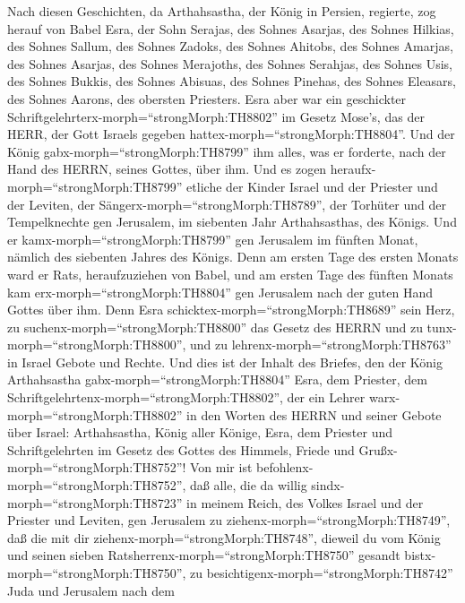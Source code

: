  Nach diesen Geschichten, da Arthahsastha, der König in
Persien, regierte, zog herauf von Babel Esra, der Sohn Serajas, des
Sohnes Asarjas, des Sohnes Hilkias,  des Sohnes Sallum, des
Sohnes Zadoks, des Sohnes Ahitobs,  des Sohnes Amarjas, des
Sohnes Asarjas, des Sohnes Merajoths,  des Sohnes Serahjas,
des Sohnes Usis, des Sohnes Bukkis,  des Sohnes Abisuas, des
Sohnes Pinehas, des Sohnes Eleasars, des Sohnes Aarons, des obersten
Priesters.  Esra aber war ein geschickter
Schriftgelehrterx-morph=``strongMorph:TH8802'' im Gesetz Mose's, das der
HERR, der Gott Israels gegeben hattex-morph=``strongMorph:TH8804''. Und
der König gabx-morph=``strongMorph:TH8799'' ihm alles, was er forderte,
nach der Hand des HERRN, seines Gottes, über ihm.  Und es
zogen heraufx-morph=``strongMorph:TH8799'' etliche der Kinder Israel und
der Priester und der Leviten, der Sängerx-morph=``strongMorph:TH8789'',
der Torhüter und der Tempelknechte gen Jerusalem, im siebenten Jahr
Arthahsasthas, des Königs.  Und er
kamx-morph=``strongMorph:TH8799'' gen Jerusalem im fünften Monat,
nämlich des siebenten Jahres des Königs.  Denn am ersten
Tage des ersten Monats ward er Rats, heraufzuziehen von Babel, und am
ersten Tage des fünften Monats kam erx-morph=``strongMorph:TH8804'' gen
Jerusalem nach der guten Hand Gottes über ihm.  Denn Esra
schicktex-morph=``strongMorph:TH8689'' sein Herz, zu
suchenx-morph=``strongMorph:TH8800'' das Gesetz des HERRN und zu
tunx-morph=``strongMorph:TH8800'', und zu
lehrenx-morph=``strongMorph:TH8763'' in Israel Gebote und Rechte.
 Und dies ist der Inhalt des Briefes, den der König
Arthahsastha gabx-morph=``strongMorph:TH8804'' Esra, dem Priester, dem
Schriftgelehrtenx-morph=``strongMorph:TH8802'', der ein Lehrer
warx-morph=``strongMorph:TH8802'' in den Worten des HERRN und seiner
Gebote über Israel:  Arthahsastha, König aller Könige,
Esra, dem Priester und Schriftgelehrten im Gesetz des Gottes des
Himmels, Friede und Grußx-morph=``strongMorph:TH8752''! 
Von mir ist befohlenx-morph=``strongMorph:TH8752'', daß alle, die da
willig sindx-morph=``strongMorph:TH8723'' in meinem Reich, des Volkes
Israel und der Priester und Leviten, gen Jerusalem zu
ziehenx-morph=``strongMorph:TH8749'', daß die mit dir
ziehenx-morph=``strongMorph:TH8748'',  dieweil du vom König
und seinen sieben Ratsherrenx-morph=``strongMorph:TH8750'' gesandt
bistx-morph=``strongMorph:TH8750'', zu
besichtigenx-morph=``strongMorph:TH8742'' Juda und Jerusalem nach dem
